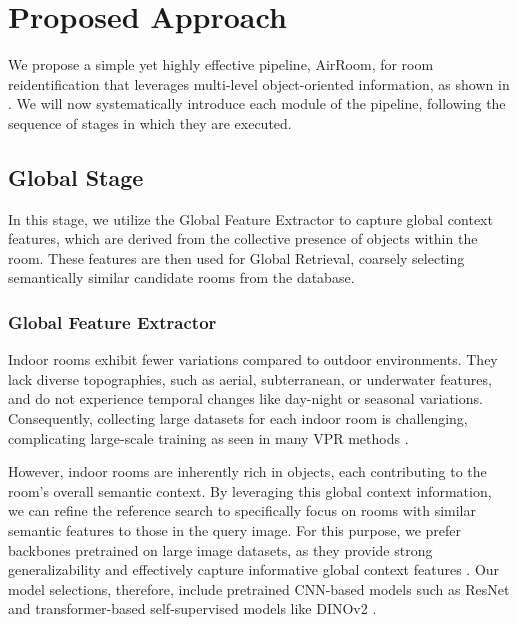\section{Proposed Approach}
\label{sec:proposed_approach}

We propose a simple yet highly effective pipeline, AirRoom, for room reidentification that leverages multi-level object-oriented information, as shown in . We will now systematically introduce each module of the pipeline, following the sequence of stages in which they are executed.

\subsection{Global Stage}

In this stage, we utilize the Global Feature Extractor to capture global context features, which are derived from the collective presence of objects within the room. These features are then used for Global Retrieval, coarsely selecting semantically similar candidate rooms from the database.

\subsubsection{Global Feature Extractor}
\label{sec:section3.1.1}

Indoor rooms exhibit fewer variations compared to outdoor environments. They lack diverse topographies, such as aerial, subterranean, or underwater features, and do not experience temporal changes like day-night or seasonal variations. Consequently, collecting large datasets for each indoor room is challenging, complicating large-scale training as seen in many VPR methods \cite{arandjelović2016netvladcnnarchitectureweakly, hausler2021patchnetvladmultiscalefusionlocallyglobal, alibey2023mixvprfeaturemixingvisual}. 

However, indoor rooms are inherently rich in objects, each contributing to the room’s overall semantic context. By leveraging this global context information, we can refine the reference search to specifically focus on rooms with similar semantic features to those in the query image. For this purpose, we prefer backbones pretrained on large image datasets, as they provide strong generalizability and effectively capture informative global context features \cite{kornblith2019betterimagenetmodelstransfer}. Our model selections, therefore, include pretrained CNN-based models such as ResNet \cite{he2015deepresiduallearningimage} and transformer-based self-supervised models like DINOv2 \cite{oquab2024dinov2learningrobustvisual}.

